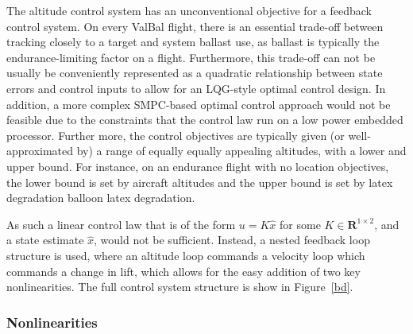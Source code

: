\documentclass[11pt]{scrartcl} %
\begin{document}
The altitude control system has an unconventional objective for a feedback control system. On every ValBal flight, there is an essential trade-off between tracking closely to a target and system ballast use, as ballast is typically the endurance-limiting factor on a flight. Furthermore, this trade-off can not be usually be conveniently represented as a quadratic relationship between state errors and control inputs to allow for an LQG-style optimal control design. In addition, a more complex SMPC-based optimal control approach would not be feasible due to the constraints that the control law run on a low power embedded processor. Further more, the control objectives are typically given (or well-approximated by) a range of equally equally appealing altitudes, with a lower and upper bound. For instance, on an endurance flight with no location objectives, the lower bound is set by aircraft altitudes and the upper bound is set by latex degradation balloon latex degradation. 

As such a linear control law that is of the form $u = K \hat x$ for some $K \in \mathbf{R}^{1 \times 2}$, and a state estimate $\hat x$, would not be sufficient. Instead, a nested feedback loop structure is used, where an altitude loop commands a velocity loop which commands a change in lift, which allows for the easy addition of two key nonlinearities. The full control system structure is show in Figure~\ref{bd}.

\subsubsection{Nonlinearities}
\end{document}
